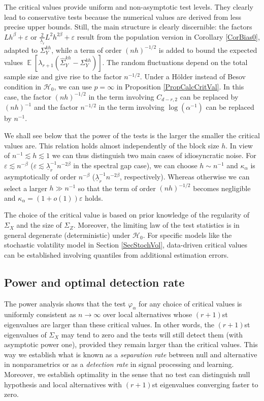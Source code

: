 \documentclass[preprint,aos]{imsart}
\numberwithin{equation}{section}
\theoremstyle{remark}
\DeclareMathOperator{\E}{{\mathbb E}}
\providecommand{\eps}{\varepsilon}
\renewcommand{\phi}{\varphi}
\providecommand{\mr}{\color{blue}}
\begin{document}
The critical values provide uniform and non-asymptotic test levels. They clearly lead to conservative tests because the numerical values are derived from less precise upper bounds. Still, the main structure is clearly discernible: the factors $Lh^\beta+\eps$ or $\frac2{\underline\lambda_r}L^2h^{2\beta}+\eps$ result from the population version in Corollary \ref{CorBias0}, adapted to $\Sigma_Y^{kh}$, while a term of order $(nh)^{-1/2}$ is added to bound the expected values  $\E[\lambda_{r+1}(\hat\Sigma^{kh}_Y-\Sigma^{kh}_Y)]$. The random fluctuations depend on the total sample size and give rise to the factor $n^{-1/2}$. Under a H\"older instead of Besov condition in ${\mathcal H}_0$, we can use $p=\infty$ in Proposition \ref{PropCalcCritVal}. In this case, the factor $(nh)^{-1/2}$ in the term involving $C_{d-r,2}$ can be replaced by $(nh)^{-1}$ and the factor $n^{-1/2}$ in the term involving $\log(\alpha^{-1})$ can be replaced by $n^{-1}$.

We shall see below that the power of the tests is the larger the smaller the critical values are. This relation holds almost independently of the block size $h$.
In view of $n^{-1}\lesssim h\lesssim 1$ we can thus distinguish  two main cases of idiosyncratic noise. For $\eps\lesssim n^{-\beta}$ ($\eps\lesssim \underline\lambda_r^{-1}n^{-2\beta}$ in the spectral gap case), we can choose $h\sim n^{-1}$ and $\kappa_\alpha$ is asymptotically of order $n^{-\beta}$ ($\underline\lambda_r^{-1}n^{-2\beta}$, respectively). Whereas otherwise we can select a larger $h\gg n^{-1}$ so that the term of order $(nh)^{-1/2}$ becomes negligible and $\kappa_\alpha=(1+o(1))\eps$ holds.

The choice of the critical value is based on prior knowledge of the regularity of $\Sigma_X$ and the size of $\Sigma_Z$. Moreover, the limiting law of the test statistics is in general degenerate (deterministic) under ${\mathcal H}_0$. For specific models like the stochastic volatility model in Section \ref{SecStochVol}, data-driven critical values can be established involving quantiles from additional estimation errors.

\subsection{\bf Power and optimal detection rate}

The power analysis shows that the test $\phi_\alpha$ for any choice of critical values is uniformly consistent as $n\to\infty$ over local alternatives whose $(r+1)$st eigenvalues are larger than these critical values. In other words, the $(r+1)$st eigenvalues of $\Sigma_X$ may tend to zero and the tests will still detect them (with asymptotic power one), provided they remain larger than the critical values. This way we establish what is known as a {\it separation rate} between null and alternative in nonparametrics or as a {\it detection rate} in signal processing and learning. Moreover, we establish optimality in the sense that no test can distinguish null hypothesis and local alternatives with $(r+1)$st eigenvalues converging faster to zero.
\end{document}
